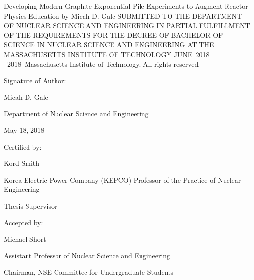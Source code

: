 \documentclass[twoside]{article}
\newcommand\blankpage{ %
    \null
    \thispagestyle{empty}
    \newpage}
\newcommand{\thesis}{Developing Modern Graphite Exponential Pile Experiments to Augment Reactor Physics Education}
\newcommand{\me}{Micah D. Gale}
\newcommand{\gradMonth}{JUNE}%
\newcommand{\gradYear}{2018}
\newcommand{\signDate}{May 18, 2018}
\newcommand{\advisorName}{Kord Smith}
\newcommand{\advisorTitle}{Korea Electric Power Company (KEPCO) Professor of the Practice of Nuclear Engineering}
\newcommand{\ugChairName}{Michael Short}
\newcommand{\ugChairTitle}{Assistant Professor of Nuclear Science and Engineering}
\newcommand{\ugChairChair}{Chairman, NSE Committee for Undergraduate Students}
\newcommand{\copyStatement}{{\textcopyright \ \gradYear \ Massachusetts Institute of Technology. All rights reserved.}}
\begin{document}
\setcounter{page}{1} %
\begin{titlepage}
    \begin{center}
    {\Large{\thesis}}
    \vfill
    {by}
    \vfill
    {\me}
    \vfill
    {SUBMITTED TO THE DEPARTMENT OF NUCLEAR SCIENCE AND ENGINEERING IN PARTIAL FULFILLMENT OF THE REQUIREMENTS FOR THE DEGREE OF}
    \vfill
    {BACHELOR OF SCIENCE IN NUCLEAR SCIENCE AND ENGINEERING}
    \vfill
    {AT THE}
    \vfill
    {MASSACHUSETTS INSTITUTE OF TECHNOLOGY}
    \vfill
    {\gradMonth\ \gradYear}
    \vfill
	\copyStatement
    \end{center}
    
    
    \begin{flushleft}
    {Signature of Author:\hrulefill}
    \end{flushleft}
    
    \begin{flushright}
    {\me }
    
    {Department of Nuclear Science and Engineering}
    
    {\signDate }
    \end{flushright}
    \vfill

    \begin{flushleft}
    {Certified by:\hrulefill}
    \end{flushleft}
    
    \begin{flushright}
    {\advisorName}
    
    {\advisorTitle}
    
    {Thesis Supervisor}
    
    \end{flushright}
    \vfill

\begin{flushleft}
    {Accepted by:\hrulefill}
    \end{flushleft}
    
    \begin{flushright}
	{\ugChairName}
	
	{\ugChairTitle}
	
	{\ugChairChair}
    \end{flushright}
    
\end{titlepage}
\blankpage
\end{document}
